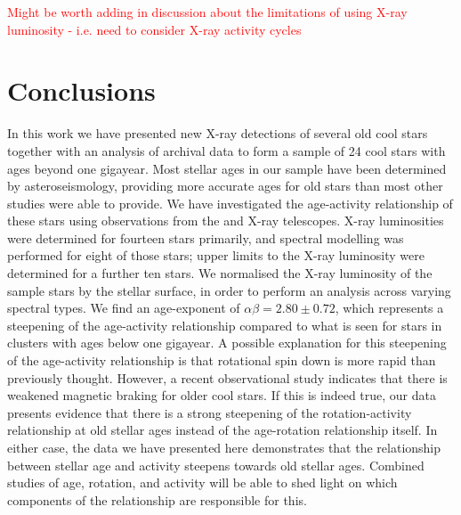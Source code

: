 \textcolor{red}{Might be worth adding in discussion about the limitations of using X-ray luminosity - i.e. need to consider X-ray activity cycles}

\section{Conclusions}
In this work we have presented new X-ray detections of several old cool stars together with an analysis of archival data to form a sample of 24 cool stars with ages beyond one gigayear. Most stellar ages in our sample have been determined by asteroseismology, providing more accurate ages for old stars than most other studies were able to provide. We have investigated the age-activity relationship of these stars using observations from the \Chandra and \XMM X-ray telescopes. X-ray luminosities were determined for fourteen stars primarily, and spectral modelling was performed for eight of those stars; upper limits to the X-ray luminosity were determined for a further ten stars. We normalised the X-ray luminosity of the sample stars by the stellar surface, in order to  perform an analysis across varying spectral types. We find an age-exponent of $\alpha\beta = 2.80 \pm 0.72$, which represents a steepening of the age-activity relationship compared to what is seen for stars in clusters with ages below one gigayear.  A possible explanation for this steepening of the age-activity relationship is that rotational spin down is more rapid than previously thought. However, a recent observational study \citep{van_Saders_etal_2016} indicates that there is weakened magnetic braking for older cool stars. If this is indeed true, our data presents evidence that there is a strong steepening of the rotation-activity relationship at old stellar ages instead of the age-rotation relationship itself. In either case, the data we have presented here demonstrates that the relationship between stellar age and activity steepens towards old stellar ages. Combined studies of age, rotation, and activity will be able to shed light on which components of the relationship are responsible for this.









\newpage